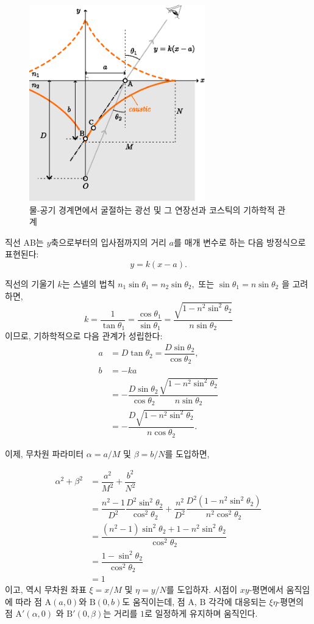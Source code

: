 \documentclass[twocolumn]{article}
\begin{document}
\begin{figure}
	\centering
	\includegraphics[width=3in]{figs/g237.eps}
	\caption{물-공기 경계면에서 굴절하는 광선 및 그 연장선과 코스틱의 기하학적 관계}
	\label{fig:geometry}
\end{figure}

 직선 AB는 $y$축으로부터의 입사점까지의 거리 $a$를 매개 변수로 하는 다음 방정식으로 표현된다:
$$y=k(x-a).$$

직선의 기울기 $k$는 스넬의 법칙
$ {n_1}\sin\theta_1 ={n_2} \sin\theta_2,$ 또는 $ \sin\theta_1 = n\sin\theta_2$
을 고려하면,
$$k=\dfrac{1}{\tan\theta_1}=\dfrac{\cos\theta_1}{\sin\theta_1}
	=\dfrac{\sqrt{1-n^2\sin^2\theta_2}}{n\sin\theta_2}$$
이므로,
기하학적으로 다음 관계가 성립한다:
$$\begin{aligned}
	a &= D\tan\theta_2 = \dfrac{D\sin\theta_2}{\cos\theta_2},\\
	b &= -ka \\
	&= -\dfrac{D\sin\theta_2}{\cos\theta_2}
	\dfrac{\sqrt{1-n^2\sin^2\theta_2}}{n\sin\theta_2}\\
	&=-\dfrac{D\sqrt{1-n^2\sin^2\theta_2}}{n\cos\theta_2}.
\end{aligned}$$

이제, 무차원 파라미터 $\alpha=a/M$ 및 $\beta=b/N$를 도입하면,

$$ \begin{aligned}
	\alpha^2 + \beta^2 &= \dfrac{a^2}{M^2}+\dfrac{b^2}{N^2}\\
	&=\dfrac{n^2-1}{D^2}\dfrac{D^2\sin^2\theta_2}{\cos^2\theta_2}%
	+\dfrac{n^2}{D^2}\dfrac{D^2(1-n^2\sin^2\theta_2)}{n^2\cos^2\theta_2}\\
	&=\dfrac{\left(n^2-1\right)\sin^2\theta_2 + 1-n^2\sin^2\theta_2}
	{\cos^2\theta_2}\\
	&=\dfrac{1-\sin^2\theta_2}{\cos^2\theta_2}\\
	&= 1
\end{aligned}$$
%
이고, 역시 무차원 좌표 $\xi=x/M$ 및 $\eta=y/N$를 도입하자. 시점이 $xy$-평면에서 움직임에 따라 점 $\mathrm{A}(a, 0)$와 $\mathrm{B}(0, b)$도 움직이는데, 점 $\mathrm{A}$, $\mathrm{B}$ 각각에 대응되는  $\xi\eta$-평면의 점 $\mathrm{A'}(\alpha, 0)$
와 $\mathrm{B'}(0, \beta)$는 거리를 $1$로 일정하게 유지하며 움직인다.
\end{document}
